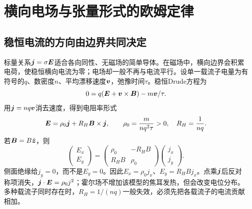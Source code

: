 \providecommand{\ExpansionDiagram}[3]{\begin{figure}[H]\centering\begin{tikzpicture}#3\end{tikzpicture}\caption{#2}\label{#1}\end{figure}}
\section{横向电场与张量形式的欧姆定律}
\subsection{稳恒电流的方向由边界共同决定}
标量关系$\bm{j}=\sigma\bm{E}$适合各向同性、无磁场的简单导体。在磁场中，横向边界会积累电荷，使稳恒横向电流为零；电场却一般不再与电流平行。设单一载流子电量为有符号的$q$、数密度$n$、平均漂移速度$\bm{v}$，弛豫时间$\tau$。稳恒Drude方程为
\[
 0=q(\bm{E}+\bm{v}\times\bm{B})-m\bm{v}/\tau.
\]
用$\bm{j}=nq\bm{v}$消去速度，得到电阻率形式
\[
 \bm{E}=\rho_0\bm{j}+R_H\bm{B}\times\bm{j},
 \qquad \rho_0=\frac{m}{nq^2\tau}>0,\quad R_H=\frac1{nq}.
\]
若$\bm{B}=B\hat{\bm{z}}$，则
\[
 \begin{pmatrix}E_x\\E_y\end{pmatrix}
 =\begin{pmatrix}\rho_0&-R_HB\\R_HB&\rho_0\end{pmatrix}
 \begin{pmatrix}j_x\\j_y\end{pmatrix}.
\]
侧面绝缘给$j_y=0$，而不是$E_y=0$。因此$E_x=\rho_0j_x$、$E_y=R_HBj_x$。点乘$\bm{j}$后反对称项消失，$\bm{j}\cdot\bm{E}=\rho_0j^2$；霍尔场不增加该模型的焦耳发热，但会改变电位分布。多种载流子同时存在时，$R_H=1/(nq)$一般失效，必须先把各载流子的电流贡献相加。

